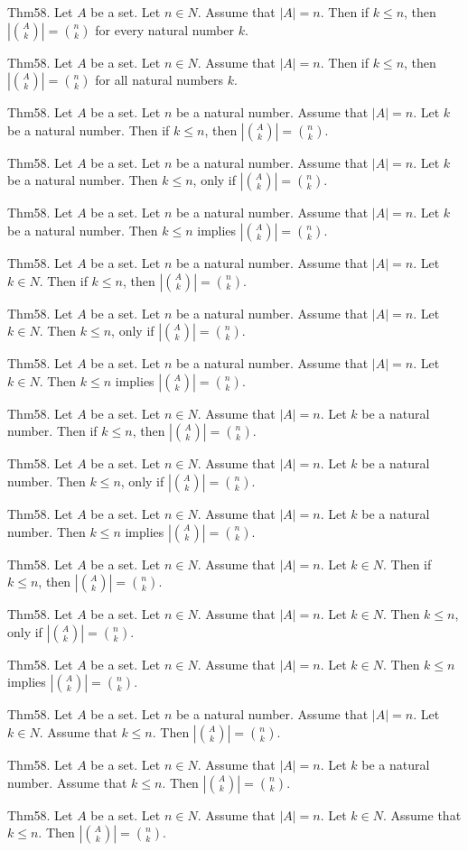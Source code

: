 \documentclass{article}
\begin{document}
Thm58. Let $A$ be a set. Let $n \in N$. Assume that $| A | = n$. Then if $k \leq n$, then $| \binom{ A }{ k}| = \binom{ n }{ k}$ for every natural number $k$.

Thm58. Let $A$ be a set. Let $n \in N$. Assume that $| A | = n$. Then if $k \leq n$, then $| \binom{ A }{ k}| = \binom{ n }{ k}$ for all natural numbers $k$.

Thm58. Let $A$ be a set. Let $n$ be a natural number. Assume that $| A | = n$. Let $k$ be a natural number. Then if $k \leq n$, then $| \binom{ A }{ k}| = \binom{ n }{ k}$.

Thm58. Let $A$ be a set. Let $n$ be a natural number. Assume that $| A | = n$. Let $k$ be a natural number. Then $k \leq n$, only if $| \binom{ A }{ k}| = \binom{ n }{ k}$.

Thm58. Let $A$ be a set. Let $n$ be a natural number. Assume that $| A | = n$. Let $k$ be a natural number. Then $k \leq n$ implies $| \binom{ A }{ k}| = \binom{ n }{ k}$.

Thm58. Let $A$ be a set. Let $n$ be a natural number. Assume that $| A | = n$. Let $k \in N$. Then if $k \leq n$, then $| \binom{ A }{ k}| = \binom{ n }{ k}$.

Thm58. Let $A$ be a set. Let $n$ be a natural number. Assume that $| A | = n$. Let $k \in N$. Then $k \leq n$, only if $| \binom{ A }{ k}| = \binom{ n }{ k}$.

Thm58. Let $A$ be a set. Let $n$ be a natural number. Assume that $| A | = n$. Let $k \in N$. Then $k \leq n$ implies $| \binom{ A }{ k}| = \binom{ n }{ k}$.

Thm58. Let $A$ be a set. Let $n \in N$. Assume that $| A | = n$. Let $k$ be a natural number. Then if $k \leq n$, then $| \binom{ A }{ k}| = \binom{ n }{ k}$.

Thm58. Let $A$ be a set. Let $n \in N$. Assume that $| A | = n$. Let $k$ be a natural number. Then $k \leq n$, only if $| \binom{ A }{ k}| = \binom{ n }{ k}$.

Thm58. Let $A$ be a set. Let $n \in N$. Assume that $| A | = n$. Let $k$ be a natural number. Then $k \leq n$ implies $| \binom{ A }{ k}| = \binom{ n }{ k}$.

Thm58. Let $A$ be a set. Let $n \in N$. Assume that $| A | = n$. Let $k \in N$. Then if $k \leq n$, then $| \binom{ A }{ k}| = \binom{ n }{ k}$.

Thm58. Let $A$ be a set. Let $n \in N$. Assume that $| A | = n$. Let $k \in N$. Then $k \leq n$, only if $| \binom{ A }{ k}| = \binom{ n }{ k}$.

Thm58. Let $A$ be a set. Let $n \in N$. Assume that $| A | = n$. Let $k \in N$. Then $k \leq n$ implies $| \binom{ A }{ k}| = \binom{ n }{ k}$.

Thm58. Let $A$ be a set. Let $n$ be a natural number. Assume that $| A | = n$. Let $k \in N$. Assume that $k \leq n$. Then $| \binom{ A }{ k}| = \binom{ n }{ k}$.

Thm58. Let $A$ be a set. Let $n \in N$. Assume that $| A | = n$. Let $k$ be a natural number. Assume that $k \leq n$. Then $| \binom{ A }{ k}| = \binom{ n }{ k}$.

Thm58. Let $A$ be a set. Let $n \in N$. Assume that $| A | = n$. Let $k \in N$. Assume that $k \leq n$. Then $| \binom{ A }{ k}| = \binom{ n }{ k}$.
\end{document}
